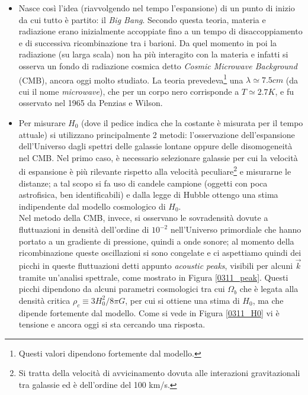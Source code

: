 \begin{itemize}
    \item Nasce così l'idea (riavvolgendo nel tempo l'espansione) di un punto di inizio da cui tutto è partito: il \textit{Big Bang}. Secondo questa teoria, materia e radiazione erano inizialmente accoppiate fino a un tempo di disaccoppiamento e di successiva ricombinazione tra i barioni. Da quel momento in poi la radiazione (su larga scala) non ha più interagito con la materia e infatti si osserva un fondo di radiazione cosmica detto \textit{Cosmic Microwave Background} (CMB), ancora oggi molto studiato. La teoria prevedeva\footnote{Questi valori dipendono fortemente dal modello.} una $\lambda\simeq 7.5\unit{cm}$ (da cui il nome \textit{microwave}), che per un corpo nero corrisponde a $T\simeq 2.7\unit{K}$, e fu osservato nel 1965 da Penzias e Wilson. 
    \item Per misurare $H_0$ (dove il pedice indica che la costante è misurata per il tempo attuale) si utilizzano principalmente 2 metodi: l'osservazione dell'espansione dell'Universo dagli spettri delle galassie lontane oppure delle disomogeneità nel CMB.
    Nel primo caso, è necessario selezionare galassie per cui la velocità di espansione è più rilevante rispetto alla velocità peculiare\footnote{Si tratta della velocità di avvicinamento dovuta alle interazioni gravitazionali tra galassie ed è dell'ordine del 100 km/s.} e misurarne le distanze; a tal scopo si fa uso di candele campione (oggetti con poca astrofisica, ben identificabili) e dalla legge di Hubble ottengo una stima indipendente dal modello cosmologico di $H_0$.\\ 
    Nel metodo della CMB, invece, si osservano le sovradensità dovute a fluttuazioni in densità dell'ordine di $10^{-2}$ nell'Universo primordiale che hanno portato a un gradiente di pressione, quindi a onde sonore; al momento della ricombinazione queste oscillazioni si sono congelate e ci aspettiamo quindi dei picchi in queste fluttuazioni detti appunto \textit{acoustic peaks}, visibili per alcuni $\Vec{k}$ tramite un'analisi spettrale, come mostrato in Figura \ref{0311_peak}. Questi picchi dipendono da alcuni parametri cosmologici tra cui $\Omega_b$ che è legata alla densità critica $\rho_c\equiv 3H_0^2/8\pi G$, per cui si ottiene una stima di $H_0$, ma che dipende fortemente dal modello. Come si vede in Figura \ref{0311_H0} vi è tensione e ancora oggi si sta cercando una risposta.

\end{itemize}
